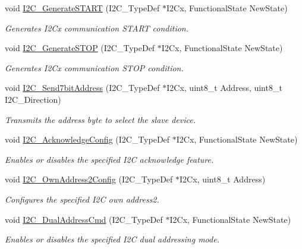 \begin{DoxyCompactItemize}
void \hyperlink{group___i2_c___group1_ga36c522b471588be9779c878222ccb20f}{I2\-C\-\_\-\-Generate\-S\-T\-A\-R\-T} (I2\-C\-\_\-\-Type\-Def $\ast$I2\-Cx, Functional\-State New\-State)
\begin{DoxyCompactList}\small\item\em Generates I2\-Cx communication S\-T\-A\-R\-T condition. \end{DoxyCompactList}\item 
void \hyperlink{group___i2_c___group1_ga5c92cb573ca0ae58cc465e5400246561}{I2\-C\-\_\-\-Generate\-S\-T\-O\-P} (I2\-C\-\_\-\-Type\-Def $\ast$I2\-Cx, Functional\-State New\-State)
\begin{DoxyCompactList}\small\item\em Generates I2\-Cx communication S\-T\-O\-P condition. \end{DoxyCompactList}\item 
void \hyperlink{group___i2_c___group1_ga009fc2a5b2313c36da39ece39a1156a6}{I2\-C\-\_\-\-Send7bit\-Address} (I2\-C\-\_\-\-Type\-Def $\ast$I2\-Cx, uint8\-\_\-t Address, uint8\-\_\-t I2\-C\-\_\-\-Direction)
\begin{DoxyCompactList}\small\item\em Transmits the address byte to select the slave device. \end{DoxyCompactList}\item 
void \hyperlink{group___i2_c___group1_ga7bb44e894d68a7991f564c43fb187486}{I2\-C\-\_\-\-Acknowledge\-Config} (I2\-C\-\_\-\-Type\-Def $\ast$I2\-Cx, Functional\-State New\-State)
\begin{DoxyCompactList}\small\item\em Enables or disables the specified I2\-C acknowledge feature. \end{DoxyCompactList}\item 
void \hyperlink{group___i2_c___group1_ga7be2cc634a613c8e3539137e897a22df}{I2\-C\-\_\-\-Own\-Address2\-Config} (I2\-C\-\_\-\-Type\-Def $\ast$I2\-Cx, uint8\-\_\-t Address)
\begin{DoxyCompactList}\small\item\em Configures the specified I2\-C own address2. \end{DoxyCompactList}\item 
void \hyperlink{group___i2_c___group1_ga02145a333a56e79557d6ef4ea03fc313}{I2\-C\-\_\-\-Dual\-Address\-Cmd} (I2\-C\-\_\-\-Type\-Def $\ast$I2\-Cx, Functional\-State New\-State)
\begin{DoxyCompactList}\small\item\em Enables or disables the specified I2\-C dual addressing mode. \end{DoxyCompactList}\item 

\end{DoxyCompactItemize}
